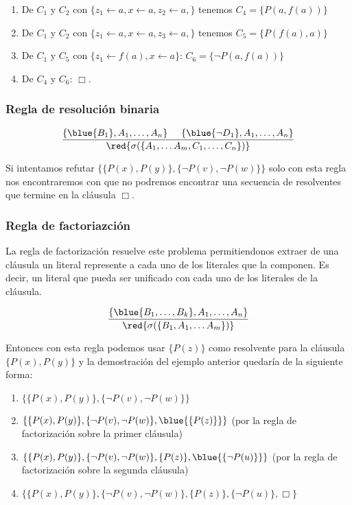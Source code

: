 \begin{centrado}
\begin{enumerate}
\item De $C_1$ y $C_2$ con $\{z_1\leftarrow a, x\leftarrow a, z_2\leftarrow a,\}$ tenemos $C_4 = \{ P(a,f(a))\}$
\item De $C_1$ y $C_2$ con $\{z_1\leftarrow a, x\leftarrow a, z_3\leftarrow a,\}$ tenemos $C_5 = \{ P(f(a),a)\}$
\item De $C_1$ y $C_5$ con $\{z_1 \leftarrow f(a), x\leftarrow a\}$: $C_6 = \{ \lnot P(a,f(a))\}$
\item De $C_4$ y $C_6$: $\Box$.
\end{enumerate}
\end{centrado}

\subsubsection{Regla de resolución binaria}

$$\frac{\{\blue{B_1},A_1,\dots,A_n\}\hspace*{5mm}\{\blue{\lnot D_1},A_1,\dots,A_n\}}{\red{\sigma(\{A_1,\dots A_m, C_1,\dots,C_n\})}}$$

\hspace*{5mm}
Si intentamos refutar $\{\{P(x), P(y)\}, \{\lnot P(v), \lnot P(w)\}\}$ solo con esta regla nos encontraremos con que no podremos encontrar una secuencia de resolventes que termine en la cláusula $\Box$.

\subsubsection*{Regla de factoriazción}
La regla de factorización resuelve este problema permitiendonos extraer de una cláusula un literal represente a cada uno de los literales que la componen. Es decir, un literal que pueda ser unificado con cada uno de los literales de la cláusula.

$$\frac{\{\blue{B_1,\dots,B_k},A_1,\dots,A_n\}}{\red{\sigma(\{B_1,A_1,\dots A_m\})}}$$

\hspace*{5mm}

Entonces con esta regla podemos usar $\{P(z)\}$ como resolvente para la cláusula $\{P(x), P(y)\}$ y la demostración del ejemplo anterior quedaría de la siguiente forma:

\begin{enumerate}
\item $\{\{P(x), P(y)\}, \{\lnot P(v), \lnot P(w)\}\}$
\item $\{\{P(x), P(y)\}, \{\lnot P(v), \lnot P(w)\}, \blue{\{P(z)\}}\}$ (por la regla de factorización sobre la primer cláusula)
\item $\{\{P(x), P(y)\}, \{\lnot P(v), \lnot P(w)\}, \{P(z)\}, \blue{\{\lnot P(u)\}}\}$ (por la regla de factorización sobre la segunda cláusula)
\item $\{\{P(x), P(y)\}, \{\lnot P(v), \lnot P(w)\}, \{P(z)\}, \{\lnot P(u)\}, \Box\}$
\end{enumerate}